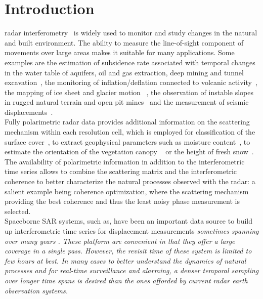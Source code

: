 \section{Introduction}
 radar interferometry~\cite{Gabriel1989, Massonnet1993,Rosen2000,Bamler1999} is widely used  to monitor and study changes in the natural and built environment. The ability to  measure the line-of-sight component  of movements over large areas makes it suitable for many  applications. Some examples are the estimation of subsidence rate associated with temporal changes in the water table of aquifers, oil and gas extraction, deep mining and tunnel excavation~\cite{Galloway1998, Strozzi2001,Galloway2007}, the monitoring of inflation/deflation connected to volcanic activity~\cite{Massonnet1995}, the mapping of ice sheet and glacier motion~\cite{Goldstein1993,Mohr1998} , the observation of  instable slopes in rugged natural terrain and open pit mines~\cite{Carnec1996,Catani2005} and the measurement of seismic displacements~\cite{Massonnet1993a,Zebker1994}.\\
Fully polarimetric radar data provides additional information on the scattering mechanism within each resolution cell, which is employed for classification of the surface cover~\cite{Cloude1997, Lee1999}, to extract geophysical parameters such as moisture content~\cite{Hajnsek2003}, to estimate the orientation of the vegetation canopy ~\cite{Ulaby1987} or the height of fresh snow~\cite{Leinss2014}.\\
The availability of polarimetric information in addition to the interferometric time series allows to combine the scattering matrix and the interferometric coherence to better characterize the natural processes observed with the radar: a salient example being coherence optimization, where the scattering mechanism providing the best coherence and thus the least noisy phase measurement is selected\cite{Pipia2009a, Iglesias2014b}.\\
Spaceborne SAR systems, such as, have been an important data source to build up interferometric time series for displacement measurements \em sometimes spanning over many years \em . These platform are convenient in that they offer a large coverage in a single pass. However, the revisit time of these system is limited to few hours at best. 
In many cases to better understand the dynamics of natural processes and for real-time surveillance and alarming, a denser temporal sampling over longer time spans is desired than the ones afforded by current radar earth observation systems.
